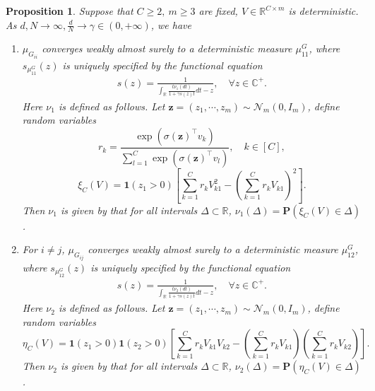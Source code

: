 \documentclass{article}
\newcommand{\R}{\mathbb{R}}
\newcommand{\mb}{\mathbb}
\newcommand\mf{\mathbf}
\newcommand{\rw}{\rightarrow}
\newcommand{\1}{^{(1)}}
\newcommand{\2}{^{(2)}}
\renewcommand{\l}{\left}
\renewcommand{\r}{\right}
\newtheorem{prop}{Proposition}
\newcommand{\bea}{\begin{equation}\begin{aligned}}
\newcommand{\eea}{\end{aligned}\end{equation}}
\begin{document}
\begin{prop}\label{MP_NN_CE_Hww}
    Suppose that $C\geq 2,\ m\geq 3$ are fixed, $V\in\R^{C\times m}$ is deterministic. As $d,N\rw\infty, \frac
    {d}{N}\rw \gamma\in (0,+\infty)$, we have
    \begin{enumerate}
        \item $\mu_{G_{ii}}$ converges weakly almost surely to a deterministic measure $\mu^G_{11}$, where $s_{\mu^G_{11}}(z)$ is uniquely specified by the functional equation
        \bea\label{MP_NN_CE_Hwiwi}
        s(z)=\frac{1}{\int_{\mb{R}} \frac{t\nu_{1}(dt)}{1+\gamma s(z)t}
 dt -z},\quad \forall z\in \mb{C}^+. 
\eea
Here $\nu_1$ is defined as follows. Let 
$\mf{z}=(z_1,\cdots,z_m)\sim \mathcal{N}_m(0,I_m)$, define random variables
$$
r_k=\frac{\exp(\sigma(\mf{z})^\top v_k)}{\sum_{l=1}^C\exp(\sigma(\mf{z})^\top v_l)},\quad k\in [C],
$$
$$
\xi_C(V)=\mf{1}(z_1>0)\l[\sum_{k=1}^C r_kV_{k1}^2-\l(\sum_{k=1}^C r_k V_{k1}\r)^2\r].
$$
Then $\nu_1$ is given by that for all intervals $\Delta\subset \mb{R}$, $\nu_1(\Delta)=\mf{P}(\xi_C(V)\in \Delta)$.

        
        \item For $i\ne j$, $\mu_{G_{ij}}$ converges weakly almost surely to a deterministic measure $\mu^G_{12}$, where $s_{\mu^G_{12}}(z)$ is uniquely specified by the functional equation
\bea\label{MP_NN_CE_Hwiwj}
        s(z)=\frac{1}{\int_{\mb{R}} \frac{t\nu_{2}(dt)}{1+\gamma s(z)t}
 dt -z},\quad \forall z\in \mb{C}^+. 
\eea
Here $\nu_2$ is defined as follows. Let 
$\mf{z}=(z_1,\cdots,z_m)\sim \mathcal{N}_m(0,I_m)$, define random variables
$$
\eta_C(V)=\mf{1}(z_1>0)\mf{1}(z_2>0)\l[\sum_{k=1}^C r_kV_{k1}V_{k2}-\l(\sum_{k=1}^C r_k V_{k1}\r)\l(\sum_{k=1}^C r_k V_{k2}\r)\r].
$$
Then $\nu_2$ is given by that for all intervals $\Delta\subset \mb{R}$, $\nu_2(\Delta)=\mf{P}(\eta_C(V)\in \Delta)$.
    \end{enumerate}
\end{prop}
\end{document}
